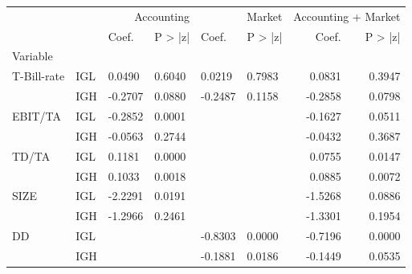 \begin{tabular}{llllllrr}
\toprule
 &  & \multicolumn{2}{r}{Accounting} & \multicolumn{2}{r}{Market} & \multicolumn{2}{r}{Accounting + Market} \\
 &  & Coef. & P > |z| & Coef. & P > |z| & Coef. & P > |z| \\
Variable &  &  &  &  &  &  &  \\
\midrule
\multirow[t]{2}{*}{T-Bill-rate} & IGL & 0.0490 & 0.6040 & 0.0219 & 0.7983 & 0.0831 & 0.3947 \\
 & IGH & -0.2707 & 0.0880 & -0.2487 & 0.1158 & -0.2858 & 0.0798 \\
\cline{1-8}
\multirow[t]{2}{*}{EBIT/TA} & IGL & -0.2852 & 0.0001 &  &  & -0.1627 & 0.0511 \\
 & IGH & -0.0563 & 0.2744 &  &  & -0.0432 & 0.3687 \\
\cline{1-8}
\multirow[t]{2}{*}{TD/TA} & IGL & 0.1181 & 0.0000 &  &  & 0.0755 & 0.0147 \\
 & IGH & 0.1033 & 0.0018 &  &  & 0.0885 & 0.0072 \\
\cline{1-8}
\multirow[t]{2}{*}{SIZE} & IGL & -2.2291 & 0.0191 &  &  & -1.5268 & 0.0886 \\
 & IGH & -1.2966 & 0.2461 &  &  & -1.3301 & 0.1954 \\
\cline{1-8}
\multirow[t]{2}{*}{DD} & IGL &  &  & -0.8303 & 0.0000 & -0.7196 & 0.0000 \\
 & IGH &  &  & -0.1881 & 0.0186 & -0.1449 & 0.0535 \\
\cline{1-8}
\bottomrule
\end{tabular}
